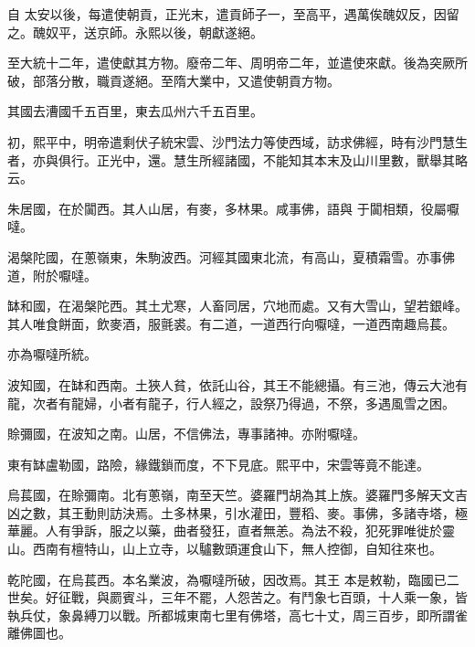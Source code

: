 \begin{pinyinscope}
 自
 太安以後，每遣使朝貢，正光末，遣貢師子一，至高平，遇萬俟醜奴反，因留之。醜奴平，送京師。永熙以後，朝獻遂絕。



 至大統十二年，遣使獻其方物。廢帝二年、周明帝二年，並遣使來獻。後為突厥所破，部落分散，職貢遂絕。至隋大業中，又遣使朝貢方物。



 其國去漕國千五百里，東去瓜州六千五百里。



 初，熙平中，明帝遣剩伏子統宋雲、沙門法力等使西域，訪求佛經，時有沙門慧生者，亦與俱行。正光中，還。慧生所經諸國，不能知其本末及山川里數，獸舉其略云。



 朱居國，在於闐西。其人山居，有麥，多林果。咸事佛，語與
 于闐相類，役屬嚈噠。



 渴槃陀國，在蔥嶺東，朱駒波西。河經其國東北流，有高山，夏積霜雪。亦事佛道，附於嚈噠。



 缽和國，在渴槃陀西。其土尤寒，人畜同居，穴地而處。又有大雪山，望若銀峰。其人唯食餅面，飲麥酒，服氈裘。有二道，一道西行向嚈噠，一道西南趣烏萇。



 亦為嚈噠所統。



 波知國，在缽和西南。土狹人貧，依託山谷，其王不能總攝。有三池，傳云大池有龍，次者有龍婦，小者有龍子，行人經之，設祭乃得過，不祭，多遇風雪之困。



 賒彌國，在波知之南。山居，不信佛法，專事諸神。亦附嚈噠。



 東有缽盧勒國，路險，緣鐵鎖而度，不下見底。熙平中，宋雲等竟不能達。



 烏萇國，在賒彌南。北有蔥嶺，南至天竺。婆羅門胡為其上族。婆羅門多解天文吉凶之數，其王動則訪決焉。土多林果，引水灌田，豐稻、麥。事佛，多諸寺塔，極華麗。人有爭訴，服之以藥，曲者發狂，直者無恙。為法不殺，犯死罪唯徙於靈山。西南有檀特山，山上立寺，以驢數頭運食山下，無人控御，自知往來也。



 乾陀國，在烏萇西。本名業波，為嚈噠所破，因改焉。其王
 本是敕勒，臨國已二世矣。好征戰，與罽賓斗，三年不罷，人怨苦之。有鬥象七百頭，十人乘一象，皆執兵仗，象鼻縛刀以戰。所都城東南七里有佛塔，高七十丈，周三百步，即所謂雀離佛圖也。




\end{pinyinscope}
